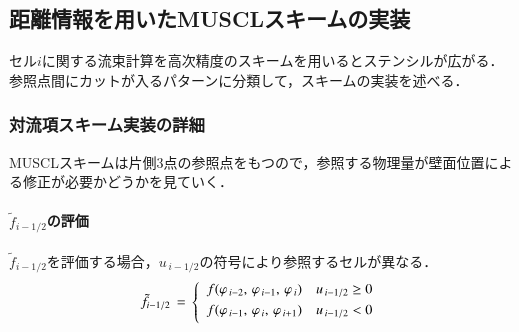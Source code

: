 \subsection{距離情報を用いたMUSCLスキームの実装}
セル$i$に関する流束計算を高次精度のスキームを用いるとステンシルが広がる．
参照点間にカットが入るパターンに分類して，スキームの実装を述べる．

%
\subsubsection{対流項スキーム実装の詳細}



MUSCLスキームは片側3点の参照点をもつので，\hypertarget{tgt:modify by cut}{参照する物理量が壁面位置による修正}が必要かどうかを見ていく．

%
\paragraph{$\tilde{f}_{i-1/2}$の評価}
$\tilde{f}_{i-1/2}$を評価する場合，$u_{\,i-1/2}$の符号により参照するセルが異なる．
\[
\tilde{f}_{i-1/2}\,=\,
\left\{
\begin{array}{ll}
\vspace{1mm}
f(\varphi_{\,i-2},\,\varphi_{\,i-1},\,\varphi_{\,i}) & u_{\,i-1/2}\ge0\\
\vspace{1mm}
f(\varphi_{\,i-1},\,\varphi_{\,i},\,\varphi_{\,i+1}) & u_{\,i-1/2}<0\\
\end{array}
\right.
\]

